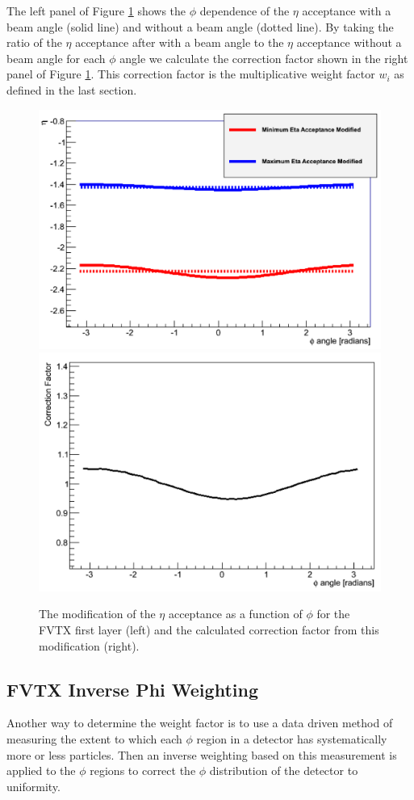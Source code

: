 The left panel of Figure \ref{fig:analytic_corr} shows the $\phi$ dependence of the $\eta$ acceptance with a beam angle (solid line) and without a beam angle (dotted line). By taking the ratio of the $\eta$ acceptance after with a beam angle to the $\eta$ acceptance without a beam angle for each $\phi$ angle we calculate the correction factor shown in the right panel of Figure \ref{fig:analytic_corr}. This correction factor is the multiplicative weight factor $w_i$ as defined in the last section.
\begin{figure}[!ht]
\centering
\includegraphics[width=0.47\linewidth]{figs/eta_modification.png}
\includegraphics[width=0.47\linewidth]{figs/analytic_correction.png}
\caption{The modification of the $\eta$ acceptance as a function of $\phi$ for the FVTX first layer (left) and the calculated correction factor from this modification (right).}
\label{fig:analytic_corr}
\end{figure}

\subsection{FVTX Inverse Phi Weighting}
\label{sec:FVTX_inv_phi_weight}
Another way to determine the weight factor is to use a data driven method of measuring the extent to which each $\phi$ region in a detector has systematically more or less particles. Then an inverse weighting based on this measurement is applied to the $\phi$ regions to correct the $\phi$ distribution of the detector to uniformity.

